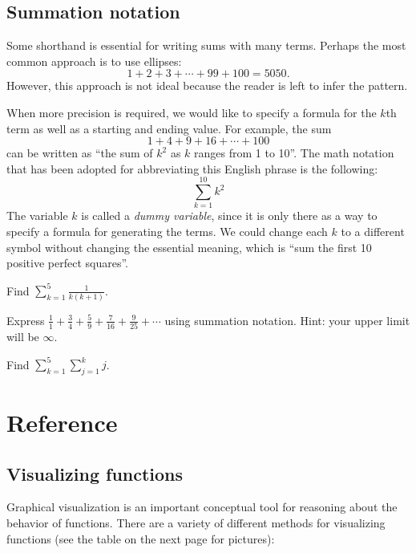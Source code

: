 \documentclass[prettycode,shellescape]{watsonbook}
\begin{document}
\subsection{Summation notation}

Some shorthand is essential for writing sums with many terms. Perhaps
the most common approach is to use ellipses:
\[
  1 + 2  + 3 + \cdots + 99 + 100 = 5050. 
\]
However, this approach is not ideal because the reader is left to
infer the pattern.

When more precision is required, we would like to specify a formula
for the $k$th term as well as a starting and ending value. For
example, the sum
\[
  1 + 4 + 9 + 16 + \cdots + 100
\]
can be written as ``the sum of $k^2$ as $k$ ranges from 1 to
10''. The math notation that has been adopted for abbreviating this
English phrase is the following:
\[
  \sum_{k=1}^{10} k^2 
\]
The variable $k$ is called a \textit{dummy variable}, since it is
only there as a way to specify a formula for generating the
terms. We could change each $k$ to a different symbol without
changing the essential meaning, which is ``sum the first 10 positive
perfect squares''.

\begin{exercise}{}{}
  Find $\displaystyle{\sum_{k=1}^5\frac{1}{k(k+1)}}$. 
\end{exercise}

\begin{exercise}{}{}
  Express
  $\tfrac{1}{1} + \tfrac{3}{4} + \tfrac{5}{9} + \tfrac{7}{16} +
  \tfrac{9}{25} + \cdots$ using summation notation. Hint: your upper
  limit will be $\infty$.
\end{exercise}

\begin{exercise}{}{}
  Find $\displaystyle{\sum_{k=1}^5\sum_{j=1}^k j }$. 
\end{exercise}

\newpage

\section{Reference} 

\subsection{Visualizing functions}

Graphical visualization is an important conceptual tool for reasoning
about the behavior of functions. There are a variety of different
methods for visualizing functions (see the table on the next page
for pictures):
\end{document}

